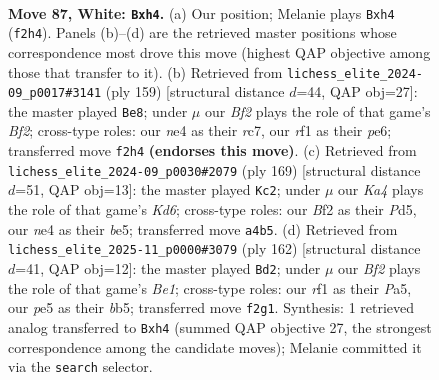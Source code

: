 \documentclass[11pt]{article}
\begin{document}
\clearpage

\begin{figure}[p]\centering
\begin{subfigure}{0.46\textwidth}\centering
\resizebox{\linewidth}{!}{%
\newchessgame
\chessboard[
  setfen={8/8/4k2p/3pp1b1/K3n2p/8/1R3B2/5r2 w - - 8 87},
  showmover=false,
  pgfstyle=straightmove, color=movearrow, markmove={f2-h4}
]}
\caption{}
\end{subfigure}\hfill
\begin{subfigure}{0.46\textwidth}\centering
\resizebox{\linewidth}{!}{%
\newchessgame
\chessboard[
  setfen={5k2/2R2b2/4P3/7p/5N2/6PP/5K2/r7 b - - 0 80},
  showmover=false,
  pgfstyle=straightmove, color=movearrow, markmove={f7-e8}
]}
\caption{}
\end{subfigure}
\\[4pt]
\begin{subfigure}{0.46\textwidth}\centering
\resizebox{\linewidth}{!}{%
\newchessgame
\chessboard[
  setfen={8/8/8/3pB1P1/3P4/3k3R/5PK1/2r5 b - - 2 85},
  showmover=false,
  pgfstyle=straightmove, color=movearrow, markmove={d3-c2}
]}
\caption{}
\end{subfigure}\hfill
\begin{subfigure}{0.46\textwidth}\centering
\resizebox{\linewidth}{!}{%
\newchessgame
\chessboard[
  setfen={8/8/p1k1K2R/Pbp5/8/3n4/8/4B3 w - - 41 82},
  showmover=false,
  pgfstyle=straightmove, color=movearrow, markmove={e1-d2}
]}
\caption{}
\end{subfigure}
\caption{\textbf{Move 87, White: \texttt{Bxh4}.} (a) Our position; Melanie plays \texttt{Bxh4} (\texttt{f2h4}). Panels (b)--(d) are the retrieved master positions whose correspondence most drove this move (highest QAP objective among those that transfer to it). (b) Retrieved from \texttt{lichess\_elite\_2024-09\_p0017\#3141} (ply 159) [structural distance $d$=44, QAP obj=27]: the master played \texttt{Be8}; under $\mu$ our \emph{Bf2} plays the role of that game's \emph{Bf2}; cross-type roles: our \emph{n}e4 as their \emph{r}c7, our \emph{r}f1 as their \emph{p}e6; transferred move \texttt{f2h4} \textbf{(endorses this move)}. (c) Retrieved from \texttt{lichess\_elite\_2024-09\_p0030\#2079} (ply 169) [structural distance $d$=51, QAP obj=13]: the master played \texttt{Kc2}; under $\mu$ our \emph{Ka4} plays the role of that game's \emph{Kd6}; cross-type roles: our \emph{B}f2 as their \emph{P}d5, our \emph{n}e4 as their \emph{b}e5; transferred move \texttt{a4b5}. (d) Retrieved from \texttt{lichess\_elite\_2025-11\_p0000\#3079} (ply 162) [structural distance $d$=41, QAP obj=12]: the master played \texttt{Bd2}; under $\mu$ our \emph{Bf2} plays the role of that game's \emph{Be1}; cross-type roles: our \emph{r}f1 as their \emph{P}a5, our \emph{p}e5 as their \emph{b}b5; transferred move \texttt{f2g1}. Synthesis: 1 retrieved analog transferred to \texttt{Bxh4} (summed QAP objective 27, the strongest correspondence among the candidate moves); Melanie committed it via the \texttt{search} selector.}
\label{fig:thought-m172}
\end{figure}
\end{document}
